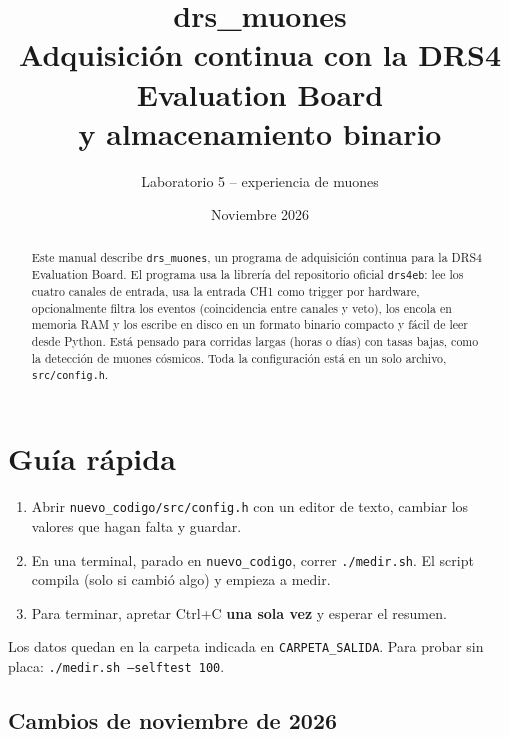 \documentclass[11pt,a4paper]{article}
\title{\textbf{drs\_muones}\\[0.3em]
\large Adquisición continua con la DRS4 Evaluation Board\\
\large y almacenamiento binario}
\author{Laboratorio 5 -- experiencia de muones}
\date{Noviembre 2026}
\newcommand{\code}[1]{\texttt{#1}}
\begin{document}
\maketitle

\begin{abstract}
\noindent
Este manual describe \code{drs\_muones}, un programa de adquisición continua para la
DRS4 Evaluation Board. El programa usa la librería del repositorio oficial
\code{drs4eb}: lee los cuatro canales de entrada, usa la entrada CH1 como trigger por
hardware, opcionalmente filtra los eventos (coincidencia entre canales y veto), los
encola en memoria RAM y los escribe en disco en un formato binario compacto y fácil
de leer desde Python. Está pensado para corridas largas (horas o días) con tasas
bajas, como la detección de muones cósmicos. Toda la configuración está en un solo
archivo, \code{src/config.h}.
\end{abstract}

\tableofcontents
\newpage

\section{Guía rápida}

\begin{enumerate}[itemsep=2pt]
  \item Abrir \code{nuevo\_codigo/src/config.h} con un editor de texto, cambiar los
        valores que hagan falta y guardar.
  \item En una terminal, parado en \code{nuevo\_codigo}, correr \code{./medir.sh}.
        El script compila (solo si cambió algo) y empieza a medir.
  \item Para terminar, apretar Ctrl+C \textbf{una sola vez} y esperar el resumen.
\end{enumerate}

Los datos quedan en la carpeta indicada en \code{CARPETA\_SALIDA}. Para probar sin
placa: \code{./medir.sh --selftest 100}.

\subsection{Cambios de noviembre de 2026}
\end{document}
